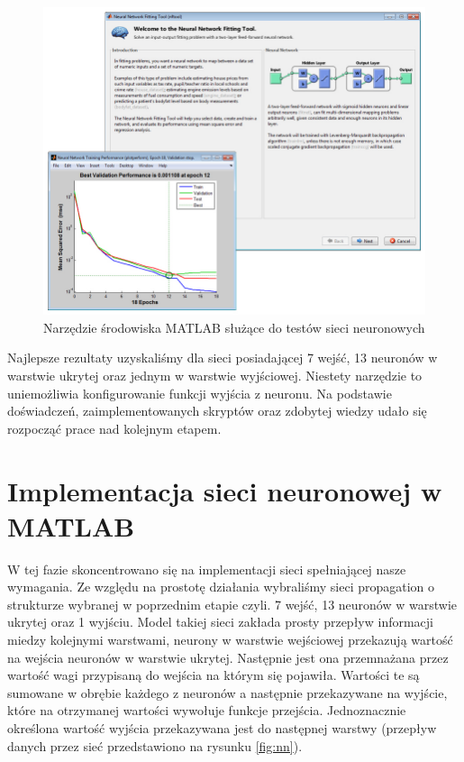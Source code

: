 \begin{figure}[tbph!]
	\centering
	\includegraphics[width=0.9\linewidth]{images/matlabnn.jpg}
	\caption{Narzędzie środowiska MATLAB służące do testów sieci neuronowych}
	\label{fig:nnmatlab}
\end{figure}

Najlepsze rezultaty uzyskaliśmy dla sieci posiadającej 7 wejść, 13 neuronów w warstwie ukrytej oraz jednym w warstwie wyjściowej. Niestety narzędzie to uniemożliwia konfigurowanie funkcji wyjścia z neuronu. Na podstawie doświadczeń, zaimplementowanych skryptów oraz zdobytej wiedzy udało się rozpocząć prace nad kolejnym etapem.

\section{Implementacja sieci neuronowej w MATLAB}
\label{cha:impl-MATLAB}
W tej fazie skoncentrowano się na implementacji sieci spełniającej nasze wymagania. Ze względu na prostotę działania wybraliśmy sieci propagation o strukturze wybranej w poprzednim etapie czyli. 7 wejść, 13 neuronów w warstwie ukrytej oraz 1 wyjściu.
Model takiej sieci zakłada prosty przepływ informacji miedzy kolejnymi warstwami, neurony w warstwie wejściowej przekazują wartość na wejścia neuronów w warstwie ukrytej.
Następnie jest ona przemnażana przez wartość wagi przypisaną do wejścia na którym się pojawiła. Wartości te są sumowane w obrębie każdego z neuronów a następnie przekazywane na wyjście, które na otrzymanej wartości wywołuje funkcje przejścia. Jednoznacznie określona wartość wyjścia przekazywana jest do następnej warstwy (przepływ danych przez sieć przedstawiono na rysunku \ref{fig:nn}).

